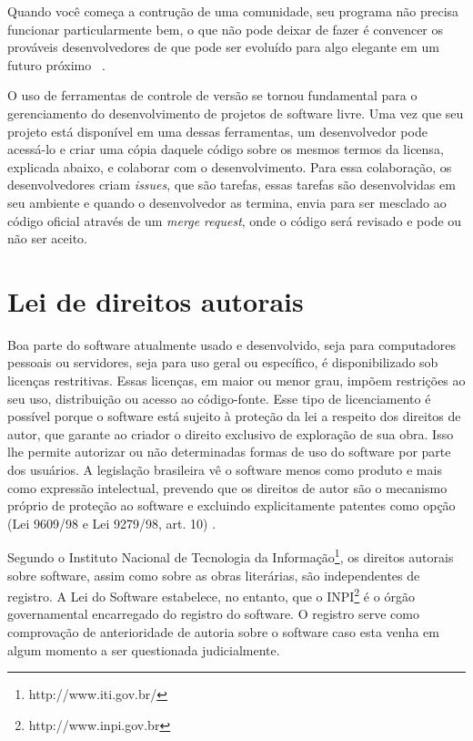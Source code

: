 Quando você começa a contrução de uma comunidade, seu programa não precisa funcionar
particularmente bem, o que não pode deixar de fazer é convencer os prováveis 
desenvolvedores de que pode ser evoluído para algo elegante em um futuro próximo
~\cite{Raymond:1999:CB:580808}.

O uso de ferramentas de controle de versão se tornou fundamental para o gerenciamento
do desenvolvimento de projetos de software livre. Uma vez que seu projeto está 
disponível em uma dessas ferramentas, um desenvolvedor pode acessá-lo e criar
uma cópia daquele código sobre os mesmos termos da licensa, explicada abaixo, e 
colaborar com o desenvolvimento. Para essa colaboração, os desenvolvedores criam
\textit{issues}, que são tarefas, essas tarefas são desenvolvidas em seu ambiente
e quando o desenvolvedor as termina, envia para ser mesclado ao código oficial através de um 
\textit{merge request}, onde o código será revisado e pode ou não ser aceito.


\section{Lei de direitos autorais}

Boa parte do software atualmente usado e desenvolvido, seja para computadores 
pessoais ou servidores, seja para uso geral ou específico, é disponibilizado sob
licenças restritivas. Essas licenças, em maior ou menor grau, impõem restrições 
ao seu uso, distribuição ou acesso ao código-fonte. Esse tipo de licenciamento é 
possível porque o software está sujeito à proteção da lei a respeito dos direitos 
de autor, que garante ao criador o direito exclusivo de exploração de sua obra. 
Isso lhe permite autorizar ou não determinadas formas de uso do software por parte 
dos usuários.
A legislação brasileira vê o software menos como produto e mais como expressão 
intelectual, prevendo que os direitos de autor são o mecanismo próprio de proteção 
ao software e excluindo explicitamente patentes como opção (Lei 9609/98 e Lei 9279/98, art. 10)
\cite{softwarepublico}.

Segundo o Instituto Nacional de Tecnologia da Informação\footnote{http://www.iti.gov.br/}, 
os direitos autorais sobre software, assim como sobre as obras literárias, são 
independentes de registro. A Lei do Software estabelece, no entanto, que o INPI\footnote{http://www.inpi.gov.br}
é o órgão governamental encarregado do registro do software. O registro serve 
como comprovação de anterioridade de autoria sobre o software caso esta venha 
em algum momento a ser questionada judicialmente.

